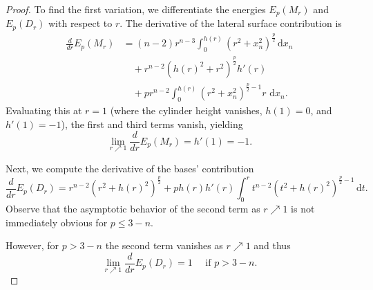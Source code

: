 \documentclass[10pt,leqno]{amsart}
\newcommand{\dd}{\, \mathrm{d}}
\numberwithin{Theorem}{section}
\theoremstyle{definition}
\theoremstyle{remark}
\numberwithin{equation}{section}
\numberwithin{equation}{section}
\begin{document}
\begin{proof}
To find the first variation, we differentiate the energies $E_p(M_r)$ and $E_p(D_r)$ with respect to $r$. The derivative of the lateral surface contribution is
\begin{align*}
    \frac{d}{dr}E_p(M_r) &= (n-2)r^{n-3}\int_0^{h(r)}(r^2+x_n^2)^{\frac{p}{2}}\dd x_n  \\
    &\quad + r^{n-2}(h(r)^2+r^2)^{\frac{p}{2}}h'(r)  \\
    &\quad + p r^{n-2}\int_0^{h(r)}(r^2+x_n^2)^{\frac{p}{2}-1}r \,  \dd x_n .
\end{align*}
Evaluating this at $r=1$ (where the cylinder height vanishes, $h(1)=0$, and $h'(1)=-1$), the first and third terms vanish, yielding
\begin{equation}\label{Mr prime}
    \lim_{r\nearrow 1}  \frac{d}{dr}E_p(M_r)  = h'(1) = -1.
\end{equation}

Next, we compute the derivative of the bases' contribution
\begin{equation}\label{EpDr prime}
    \frac{d}{dr}E_p(D_r) =  r^{n-2}(r^2+h(r)^2)^{\frac{p}{2}} + p h(r)h'(r) \int_0^r t^{n-2}(t^2+h(r)^2)^{\frac{p}{2}-1}   \dd t .
\end{equation}
Observe that the asymptotic behavior of the second term as $r \nearrow 1$ is not immediately obvious for $p\leq 3-n$.


However, for $p>3-n$ the second term vanishes as $r \nearrow 1$ and thus
$$
  \lim_{r\nearrow 1} \frac{d}{dr}E_p(D_r) = 1\quad\text{ if } p>3-n.
$$


\end{proof}
\end{document}
